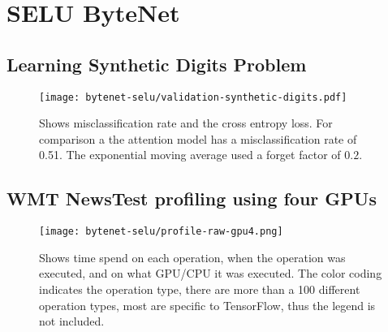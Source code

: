 \clearpage

\section{SELU ByteNet}
\label{appendix:result:bytenet-selu}
\subsection{Learning Synthetic Digits Problem}
\begin{figure}[h]
    \centering
    \texttt{[image: bytenet-selu/validation-synthetic-digits.pdf]}
    \caption{Shows misclassification rate and the cross entropy loss. For comparison a the attention model has a misclassification rate of 0.51. The exponential moving average used a forget factor of $0.2$.}
\end{figure}

\clearpage
\subsection{WMT NewsTest profiling using four GPUs}
\begin{figure}[h]
    \centering
    \texttt{[image: bytenet-selu/profile-raw-gpu4.png]}
    \caption{Shows time spend on each operation, when the operation was executed, and on what GPU/CPU it was executed. The color coding indicates the operation type, there are more than a 100 different operation types, most are specific to TensorFlow, thus the legend is not included.}
\end{figure}